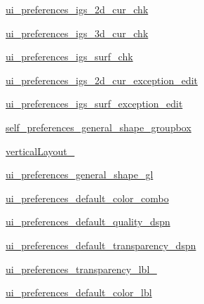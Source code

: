 \begin{DoxyCompactItemize}
\item 
\hyperlink{classsettings_1_1preferences_u_i_1_1_ui___preferences_dialog_a1ce10779ded45f28b6afd571de7c1dc4}{ui\+\_\+preferences\+\_\+igs\+\_\+2d\+\_\+cur\+\_\+chk}
\item 
\hyperlink{classsettings_1_1preferences_u_i_1_1_ui___preferences_dialog_af72b1a9124fb421c1fbe62adb174fe77}{ui\+\_\+preferences\+\_\+igs\+\_\+3d\+\_\+cur\+\_\+chk}
\item 
\hyperlink{classsettings_1_1preferences_u_i_1_1_ui___preferences_dialog_a6ff22661fcefd7225763bd7655ceb36c}{ui\+\_\+preferences\+\_\+igs\+\_\+surf\+\_\+chk}
\item 
\hyperlink{classsettings_1_1preferences_u_i_1_1_ui___preferences_dialog_a4e600e40407001e5ea272f73f359cde8}{ui\+\_\+preferences\+\_\+igs\+\_\+2d\+\_\+cur\+\_\+exception\+\_\+edit}
\item 
\hyperlink{classsettings_1_1preferences_u_i_1_1_ui___preferences_dialog_a420fe65d048f3d9f4c464f5426f72928}{ui\+\_\+preferences\+\_\+igs\+\_\+surf\+\_\+exception\+\_\+edit}
\item 
\hyperlink{classsettings_1_1preferences_u_i_1_1_ui___preferences_dialog_a58f750a42bbb7ed7e89fe15f5883bf3d}{self\+\_\+preferences\+\_\+general\+\_\+shape\+\_\+groupbox}
\item 
\hyperlink{classsettings_1_1preferences_u_i_1_1_ui___preferences_dialog_a6cf68c068ac0041c158fb99804e4f6b2}{vertical\+Layout\+\_}
\item 
\hyperlink{classsettings_1_1preferences_u_i_1_1_ui___preferences_dialog_a44174aad3cbdfd15fed7998607c98f74}{ui\+\_\+preferences\+\_\+general\+\_\+shape\+\_\+gl}
\item 
\hyperlink{classsettings_1_1preferences_u_i_1_1_ui___preferences_dialog_a0b043ee35d1213137f70620301f00d5f}{ui\+\_\+preferences\+\_\+default\+\_\+color\+\_\+combo}
\item 
\hyperlink{classsettings_1_1preferences_u_i_1_1_ui___preferences_dialog_a018f3104e4bb1e4f93acdb919f43d4a7}{ui\+\_\+preferences\+\_\+default\+\_\+quality\+\_\+dspn}
\item 
\hyperlink{classsettings_1_1preferences_u_i_1_1_ui___preferences_dialog_a87156afaeff8f61b423a3b7cafc07619}{ui\+\_\+preferences\+\_\+default\+\_\+transparency\+\_\+dspn}
\item 
\hyperlink{classsettings_1_1preferences_u_i_1_1_ui___preferences_dialog_af4af1d948631ab4e16506f3dc6ad476d}{ui\+\_\+preferences\+\_\+transparency\+\_\+lbl\+\_}
\item 
\hyperlink{classsettings_1_1preferences_u_i_1_1_ui___preferences_dialog_a2469ae136e448dd1df44686ae61f5f01}{ui\+\_\+preferences\+\_\+default\+\_\+color\+\_\+lbl}

\end{DoxyCompactItemize}
